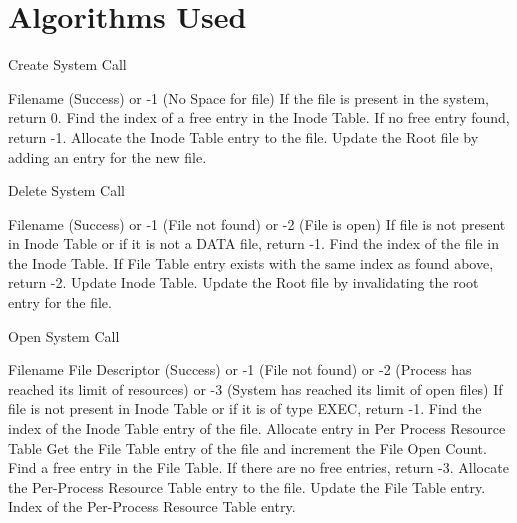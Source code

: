 \chapter{Algorithms Used}
\label{chap9}
\renewcommand{\algorithmicrequire}{\textbf{Input:}}
\renewcommand{\algorithmicensure}{\textbf{Output:}}

\begin{algorithm}
\caption{Create System Call}
\begin{algorithmic}
\REQUIRE Filename
 (Success) or -1 (No Space for file)
\STATE If the file is present in the system, return 0.   
\STATE Find the index of a free entry in the Inode Table. If no free entry found, return -1.  
\STATE Allocate the Inode Table entry to the file.
\STATE Update the Root file by adding an entry for the new file.  
\end{algorithmic}
\end{algorithm}


\begin{algorithm}
\caption{Delete System Call}
\begin{algorithmic}
\REQUIRE Filename
 (Success) or -1 (File not found) or -2 (File is open)
\STATE If file is not present in Inode Table or if it is not a DATA file, return -1.
\STATE Find the index of the file in the Inode Table.
\STATE If File Table entry exists with the same index as found above, return -2. 
\STATE Update Inode Table.
\STATE Update the Root file by invalidating the root entry for the file.
\end{algorithmic}
\end{algorithm}


\begin{algorithm}
\caption{Open System Call}
\begin{algorithmic}
\REQUIRE Filename
\ENSURE File Descriptor (Success) or -1 (File not found) or -2 (Process has reached its limit of resources) or -3 (System has reached its limit of open files)
\STATE If file is not present in Inode Table or if it is of type EXEC, return -1.
\STATE Find the index of the Inode Table entry of the file.
\STATE Allocate entry in Per Process Resource Table
    \STATE Get the File Table entry of the file and increment the File Open Count.
\ELSE
    \STATE Find a free entry in the File Table. If there are no free entries, return -3.
\ENDIF
\STATE Allocate the Per-Process Resource Table entry to the file.
\STATE Update the File Table entry.
\RETURN Index of the Per-Process Resource Table entry.
\end{algorithmic}
\end{algorithm}

